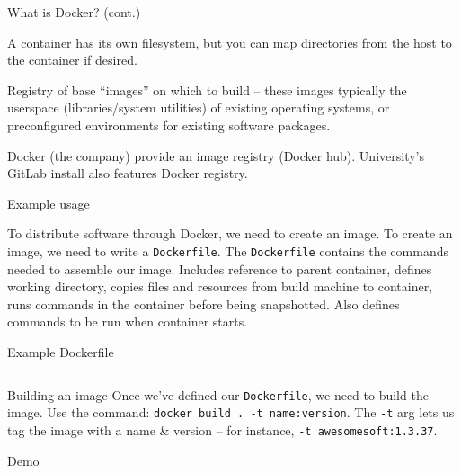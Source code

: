 \documentclass[10pt]{beamer}
\begin{document}
\begin{frame}[fragile]{What is Docker? (cont.)}
	
	\vfill A container has its own filesystem, but you can map directories from the host to the container if desired.

	\vfill Registry of base ``images'' on which to build -- these images typically the userspace (libraries/system utilities) of existing operating systems, or preconfigured environments for existing software packages.

	\vfill Docker (the company) provide an image registry (Docker hub). University's GitLab install also features Docker registry.
\end{frame}

\begin{frame}[fragile]{Example usage}

	\vfill To distribute software through Docker, we need to create an image.
	\vfill To create an image, we need to write a \verb|Dockerfile|.
	\vfill The \verb|Dockerfile| contains the commands needed to assemble our image.
	\vfill Includes reference to parent container, defines working directory, copies files and resources from build machine to container, runs commands in the container before being snapshotted.
	\vfill Also defines commands to be run when container starts.
\end{frame}

\begin{frame}[fragile]{Example Dockerfile}
	\inputminted{Dockerfile}{example/Dockerfile}
\end{frame}

\begin{frame}[fragile]{Building an image}
	\vfill Once we've defined our \verb|Dockerfile|, we need to build the image.
	\vfill Use the command: \verb|docker build . -t name:version|.
	\vfill The \verb|-t| arg lets us tag the image with a name \& version -- for instance, \verb|-t awesomesoft:1.3.37|.
\end{frame}

\begin{frame}[fragile]{Demo}

\vfill

\end{frame}
\end{document}
